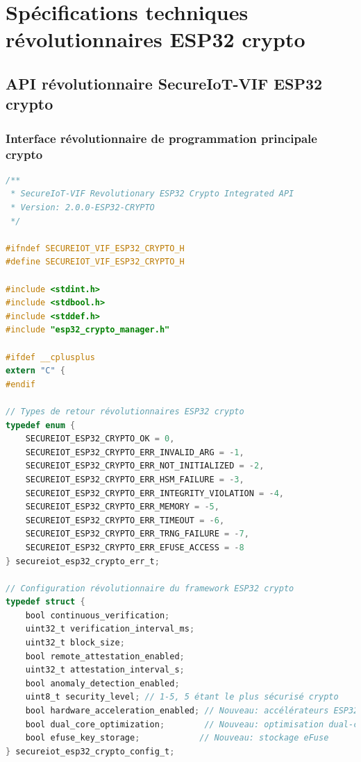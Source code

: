 \chapter{Spécifications techniques révolutionnaires ESP32 crypto}
\label{app:revolutionary-technical-specs}

\section{API révolutionnaire SecureIoT-VIF ESP32 crypto}

\subsection{Interface révolutionnaire de programmation principale crypto}

\begin{lstlisting}[language=C, caption={API révolutionnaire publique SecureIoT-VIF ESP32 crypto intégré}]
/**
 * SecureIoT-VIF Revolutionary ESP32 Crypto Integrated API
 * Version: 2.0.0-ESP32-CRYPTO
 */

#ifndef SECUREIOT_VIF_ESP32_CRYPTO_H
#define SECUREIOT_VIF_ESP32_CRYPTO_H

#include <stdint.h>
#include <stdbool.h>
#include <stddef.h>
#include "esp32_crypto_manager.h"

#ifdef __cplusplus
extern "C" {
#endif

// Types de retour révolutionnaires ESP32 crypto
typedef enum {
    SECUREIOT_ESP32_CRYPTO_OK = 0,
    SECUREIOT_ESP32_CRYPTO_ERR_INVALID_ARG = -1,
    SECUREIOT_ESP32_CRYPTO_ERR_NOT_INITIALIZED = -2,
    SECUREIOT_ESP32_CRYPTO_ERR_HSM_FAILURE = -3,
    SECUREIOT_ESP32_CRYPTO_ERR_INTEGRITY_VIOLATION = -4,
    SECUREIOT_ESP32_CRYPTO_ERR_MEMORY = -5,
    SECUREIOT_ESP32_CRYPTO_ERR_TIMEOUT = -6,
    SECUREIOT_ESP32_CRYPTO_ERR_TRNG_FAILURE = -7,
    SECUREIOT_ESP32_CRYPTO_ERR_EFUSE_ACCESS = -8
} secureiot_esp32_crypto_err_t;

// Configuration révolutionnaire du framework ESP32 crypto
typedef struct {
    bool continuous_verification;
    uint32_t verification_interval_ms;
    uint32_t block_size;
    bool remote_attestation_enabled;
    uint32_t attestation_interval_s;
    bool anomaly_detection_enabled;
    uint8_t security_level; // 1-5, 5 étant le plus sécurisé crypto
    bool hardware_acceleration_enabled; // Nouveau: accélérateurs ESP32
    bool dual_core_optimization;        // Nouveau: optimisation dual-core
    bool efuse_key_storage;            // Nouveau: stockage eFuse
} secureiot_esp32_crypto_config_t;


\end{lstlisting}
